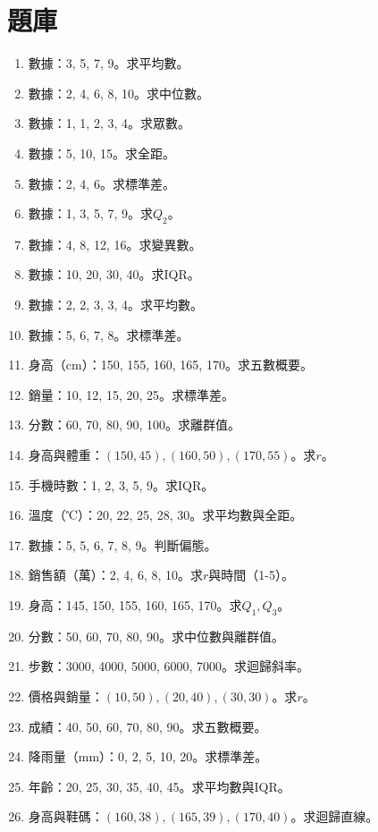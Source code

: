 \section{題庫}
\begin{enumerate}[label=\arabic*.]
    \item 數據：3, 5, 7, 9。求平均數。
    \item 數據：2, 4, 6, 8, 10。求中位數。
    \item 數據：1, 1, 2, 3, 4。求眾數。
    \item 數據：5, 10, 15。求全距。
    \item 數據：2, 4, 6。求標準差。
    \item 數據：1, 3, 5, 7, 9。求$Q_2$。
    \item 數據：4, 8, 12, 16。求變異數。
    \item 數據：10, 20, 30, 40。求IQR。
    \item 數據：2, 2, 3, 3, 4。求平均數。
    \item 數據：5, 6, 7, 8。求標準差。
    \item 身高（cm）：150, 155, 160, 165, 170。求五數概要。
    \item 銷量：10, 12, 15, 20, 25。求標準差。
    \item 分數：60, 70, 80, 90, 100。求離群值。
    \item 身高與體重：$(150, 45), (160, 50), (170, 55)$。求$r$。
    \item 手機時數：1, 2, 3, 5, 9。求IQR。
    \item 溫度（℃）：20, 22, 25, 28, 30。求平均數與全距。
    \item 數據：5, 5, 6, 7, 8, 9。判斷偏態。
    \item 銷售額（萬）：2, 4, 6, 8, 10。求$r$與時間（1-5）。
    \item 身高：145, 150, 155, 160, 165, 170。求$Q_1, Q_3$。
    \item 分數：50, 60, 70, 80, 90。求中位數與離群值。
    \item 步數：3000, 4000, 5000, 6000, 7000。求迴歸斜率。
    \item 價格與銷量：$(10, 50), (20, 40), (30, 30)$。求$r$。
    \item 成績：40, 50, 60, 70, 80, 90。求五數概要。
    \item 降雨量（mm）：0, 2, 5, 10, 20。求標準差。
    \item 年齡：20, 25, 30, 35, 40, 45。求平均數與IQR。
    \item 身高與鞋碼：$(160, 38), (165, 39), (170, 40)$。求迴歸直線。

\end{enumerate}
